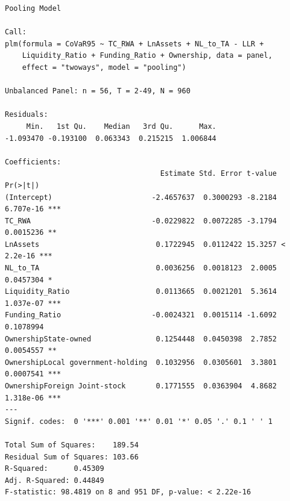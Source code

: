 \documentclass[
  12pt,
  a4paper,
  DIV=11,
  numbers=noendperiod]{scrreprt}
\begin{document}
\begin{verbatim}
Pooling Model

Call:
plm(formula = CoVaR95 ~ TC_RWA + LnAssets + NL_to_TA - LLR + 
    Liquidity_Ratio + Funding_Ratio + Ownership, data = panel, 
    effect = "twoways", model = "pooling")

Unbalanced Panel: n = 56, T = 2-49, N = 960

Residuals:
     Min.   1st Qu.    Median   3rd Qu.      Max. 
-1.093470 -0.193100  0.063343  0.215215  1.006844 

Coefficients:
                                    Estimate Std. Error t-value  Pr(>|t|)    
(Intercept)                       -2.4657637  0.3000293 -8.2184 6.707e-16 ***
TC_RWA                            -0.0229822  0.0072285 -3.1794 0.0015236 ** 
LnAssets                           0.1722945  0.0112422 15.3257 < 2.2e-16 ***
NL_to_TA                           0.0036256  0.0018123  2.0005 0.0457304 *  
Liquidity_Ratio                    0.0113665  0.0021201  5.3614 1.037e-07 ***
Funding_Ratio                     -0.0024321  0.0015114 -1.6092 0.1078994    
OwnershipState-owned               0.1254448  0.0450398  2.7852 0.0054557 ** 
OwnershipLocal government-holding  0.1032956  0.0305601  3.3801 0.0007541 ***
OwnershipForeign Joint-stock       0.1771555  0.0363904  4.8682 1.318e-06 ***
---
Signif. codes:  0 '***' 0.001 '**' 0.01 '*' 0.05 '.' 0.1 ' ' 1

Total Sum of Squares:    189.54
Residual Sum of Squares: 103.66
R-Squared:      0.45309
Adj. R-Squared: 0.44849
F-statistic: 98.4819 on 8 and 951 DF, p-value: < 2.22e-16
\end{verbatim}
\end{document}
